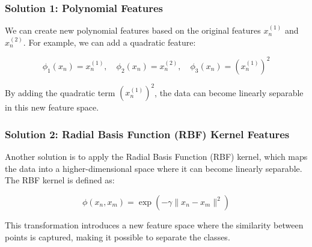 \subsubsection*{Solution 1: Polynomial Features}

We can create new polynomial features based on the original features \( x_n^{(1)} \) and \( x_n^{(2)} \). For example, we can add a quadratic feature:

\[
\phi_1(x_n) = x_n^{(1)}, \quad \phi_2(x_n) = x_n^{(2)}, \quad \phi_3(x_n) = (x_n^{(1)})^2
\]

By adding the quadratic term \( (x_n^{(1)})^2 \), the data can become linearly separable in this new feature space.

\subsubsection*{Solution 2: Radial Basis Function (RBF) Kernel Features}

Another solution is to apply the Radial Basis Function (RBF) kernel, which maps the data into a higher-dimensional space where it can become linearly separable. The RBF kernel is defined as:

\[
\phi(x_n, x_m) = \exp\left(-\gamma \| x_n - x_m \|^2 \right)
\]

This transformation introduces a new feature space where the similarity between points is captured, making it possible to separate the classes.

